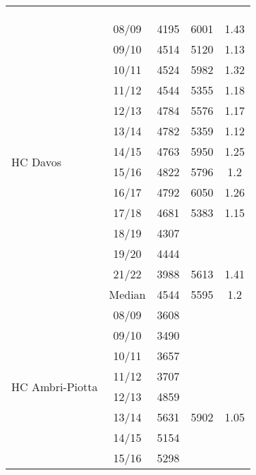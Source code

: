 \begin{longtable}[c]{p{5cm}cccc}
    \multicolumn{5}{c}{} \\ 
    \multicolumn{5}{c}{} \\
    \multicolumn{5}{c}{} \\
    \multirow[t]{14}{=}{HC Davos} & 08/09 & 4195 & 6001 & 1.43 \\ 
                                 & 09/10 & 4514 & 5120 & 1.13 \\ 
                                 & 10/11 & 4524 & 5982 & 1.32 \\ 
                                 & 11/12 & 4544 & 5355 & 1.18 \\ 
                                 & 12/13 & 4784 & 5576 & 1.17 \\ 
                                 & 13/14 & 4782 & 5359 & 1.12 \\ 
                                 & 14/15 & 4763 & 5950 & 1.25 \\ 
                                 & 15/16 & 4822 & 5796 & 1.2 \\ 
                                 & 16/17 & 4792 & 6050 & 1.26 \\ 
                                 & 17/18 & 4681 & 5383 & 1.15 \\ 
                                 & 18/19 & 4307 & ~ & ~ \\ 
                                 & 19/20 & 4444 & ~ & ~ \\ 
                                 & 21/22 & 3988 & 5613 & 1.41 \\
                                 \cmidrule{2-5}
                                 & Median & 4544 & 5595 & 1.2 \\ 
                                 \cmidrule{1-5}
    \multirow[t]{14}{=}{HC Ambri-Piotta}  & 08/09 & 3608 & ~ & ~ \\ 
                                         & 09/10 & 3490 & ~ & ~ \\ 
                                         & 10/11 & 3657 & ~ & ~ \\ 
                                         & 11/12 & 3707 & ~ & ~ \\ 
                                         & 12/13 & 4859 & ~ & ~ \\ 
                                         & 13/14 & 5631 & 5902 & 1.05 \\ 
                                         & 14/15 & 5154 & ~ & ~ \\ 
                                         & 15/16 & 5298 & ~ & ~ \\ 

\end{longtable}
